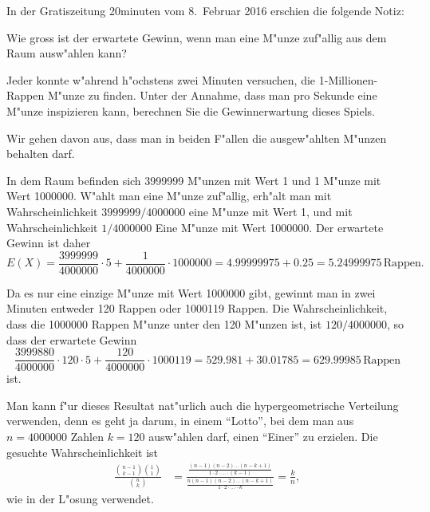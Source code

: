 In der Gratiszeitung 20minuten vom 8.~Februar 2016 erschien die folgende
Notiz:
\begin{center}
\end{center}
\begin{teilaufgaben}
\item Wie gross ist der erwartete Gewinn, wenn man eine M"unze zuf"allig
aus dem Raum ausw"ahlen kann?
\item
Jeder konnte w"ahrend h"ochstens zwei Minuten versuchen, die 1-Millionen-Rappen
M"unze zu finden. 
Unter der Annahme, dass man pro Sekunde eine M"unze inspizieren kann, 
berechnen Sie die Gewinnerwartung dieses Spiels.
\end{teilaufgaben}
Wir gehen davon aus, dass man in beiden F"allen die ausgew"ahlten M"unzen
behalten darf.

\begin{loesung}
\begin{teilaufgaben}
\item
In dem Raum befinden sich 3999999 M"unzen mit Wert 1 und 1 M"unze mit
Wert 1000000.
W"ahlt man eine M"unze zuf"allig, erh"alt man mit Wahrscheinlichkeit
$3999999/4000000$ eine M"unze mit Wert 1, und mit Wahrscheinlichkeit
$1/4000000$ Eine M"unze mit Wert 1000000.
Der erwartete Gewinn ist daher
\[
E(X) = \frac{3999999}{4000000}\cdot 5 + \frac{1}{4000000}\cdot 1000000
=4.99999975 + 0.25 = 5.24999975\,\text{Rappen}.
\]
\item
Da es nur eine einzige M"unze mit Wert 1000000 gibt, gewinnt man
in zwei Minuten entweder 120 Rappen oder 1000119 Rappen.
Die Wahrscheinlichkeit, dass die 1000000 Rappen M"unze unter den
120 M"unzen ist, ist $120/4000000$, so dass der erwartete Gewinn
\[
\frac{3999880}{4000000}\cdot 120\cdot 5
+
\frac{120}{4000000}\cdot 1000119
=
529.981 + 30.01785=629.99985\,\text{Rappen}
\]
ist.
\end{teilaufgaben}
\end{loesung}

\begin{diskussion}
Man kann f"ur dieses Resultat nat"urlich auch die hypergeometrische
Verteilung verwenden, denn es geht ja darum, in einem ``Lotto'', bei dem
man aus $n=4000000$ Zahlen $k=120$ ausw"ahlen darf, einen ``Einer''
zu erzielen.
Die gesuchte Wahrscheinlichkeit ist
\begin{align*}
\frac{\displaystyle\binom{n-1}{k-1}\binom{1}{1}}{\displaystyle\binom{n}{k}}
&=
\frac{\displaystyle\frac{(n-1)(n-2)\dots(n-k+1)}{1\cdot 2\cdot\dots\cdot (k-1)}}%
{\displaystyle\frac{n(n-1)(n-2)\dots(n-k+1)}{1\cdot 2\cdot\dots\cdots k}}
=\frac{k}{n},
\end{align*}
wie in der L"osung verwendet.
\end{diskussion}

